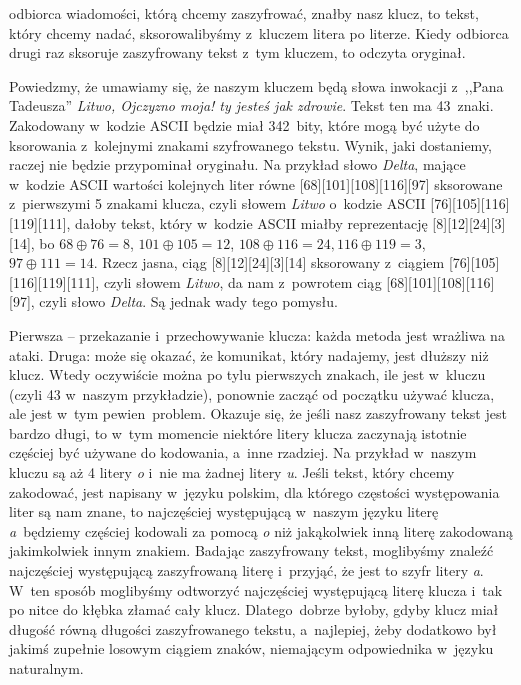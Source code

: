  odbiorca wiadomości, którą chcemy zaszyfrować, znałby
nasz
klucz, to tekst, który chcemy nadać, sksorowalibyśmy z~kluczem litera po
literze. Kiedy odbiorca drugi raz sksoruje zaszyfrowany tekst z~tym kluczem, to
odczyta oryginał. 


Powiedzmy, że umawiamy się, że naszym kluczem będą słowa inwokacji z~,,Pana
Tadeusza'' {\em Litwo, Ojczyzno moja! ty jesteś jak zdrowie}. Tekst ten ma 43~znaki. Zakodowany w~kodzie ASCII będzie miał 342~bity, które mogą być użyte do
ksorowania z~kolejnymi znakami szyfrowanego tekstu. Wynik, jaki dostaniemy,
raczej nie będzie przypominał oryginału.  Na przykład słowo {\em Delta\/},
mające w~kodzie ASCII wartości kolejnych liter równe [68][101][108][116][97]
sksorowane z~pierwszymi 5 znakami klucza, czyli słowem {\em Litwo\/} o~kodzie
ASCII [76][105][116][119][111], dałoby tekst,
który w~kodzie ASCII miałby reprezentację
[8][12][24][3][14], bo $68 \oplus 76=8$, $101\oplus
105=12$, $108\oplus 116 = 24,
116\oplus 119=3$, $97\oplus 111=14$. Rzecz jasna, ciąg
[8][12][24][3][14] sksorowany
z~ciągiem  [76][105][116][119][111], czyli słowem {\em Litwo\/}, da nam
z~powrotem ciąg [68][101][108][116][97], czyli słowo {\em Delta}. Są jednak wady
tego pomysłu.

Pierwsza -- przekazanie i~przechowywanie klucza: każda metoda jest wrażliwa na
ataki. Druga: może się okazać, że komunikat, który nadajemy, jest dłuższy niż
klucz. Wtedy oczywiście można po tylu pierwszych znakach, ile jest w~kluczu
(czyli 43 w~naszym przykładzie), ponownie zacząć od początku używać klucza, ale
jest w~tym pewien~problem. Okazuje się, że jeśli nasz zaszyfrowany tekst jest bardzo długi,
to w~tym momencie niektóre litery klucza zaczynają istotnie częściej być używane
do kodowania, a~inne rzadziej. Na przykład w~naszym kluczu są aż 4 litery {\em
o\/} i~nie ma żadnej litery {\em u}. Jeśli tekst, który chcemy zakodować, jest napisany
w~języku polskim, dla którego częstości występowania liter są nam znane, to
najczęściej występującą w~naszym języku literę \textit{a}~będziemy częściej kodowali za
pomocą \textit{o} niż jakąkolwiek inną literę zakodowaną jakimkolwiek innym znakiem.
Badając zaszyfrowany tekst, moglibyśmy znaleźć najczęściej występującą
zaszyfrowaną literę i~przyjąć, że jest to szyfr litery \textit{a}. W~ten sposób moglibyśmy odtworzyć najczęściej
występującą literę klucza i~tak po nitce do kłębka złamać cały klucz. 
Dlatego~dobrze byłoby, gdyby klucz miał długość równą długości zaszyfrowanego tekstu,
a~najlepiej, żeby dodatkowo był jakimś zupełnie losowym ciągiem znaków,
niemającym odpowiednika w~języku naturalnym. 

